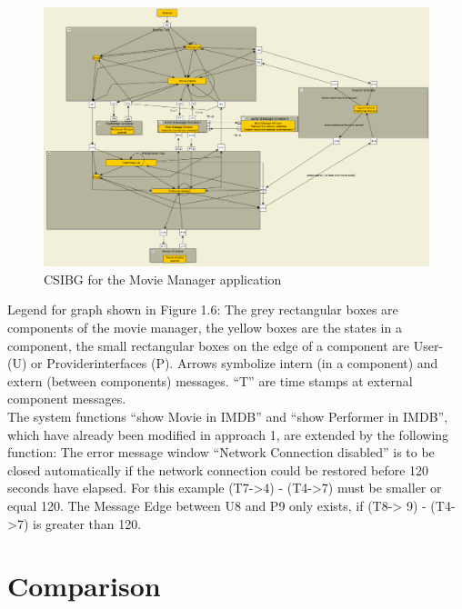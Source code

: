 \begin{figure}[H]
\centering{}\includegraphics[scale=0.8]{../images/Application2_MovieManager}\caption{CSIBG for the Movie Manager application}
\end{figure}
Legend for graph shown in Figure 1.6: The grey rectangular boxes are
components of the movie manager, the yellow boxes are the states in
a component, the small rectangular boxes on the edge of a component
are User- (U) or Providerinterfaces (P). Arrows symbolize intern (in
a component) and extern (between components) messages. \enquote{T}
are time stamps at external component messages. \\
The system functions \enquote{show Movie in IMDB}
and \enquote{show Performer in IMDB}, which have
already been modified in approach 1, are extended by the following
function: The error message window \enquote{Network Connection
disabled} is to be closed automatically if the network
connection could be restored before 120 seconds have elapsed. For
this example (T7-\textgreater 4) - (T4-\textgreater 7) must be smaller
or equal 120. The Message Edge between U8 and P9 only exists, if (T8-\textgreater
9) - (T4-\textgreater 7) is greater than 120.

\section{Comparison\label{sec:Comparison}}

